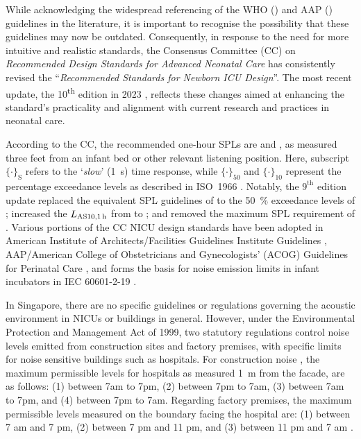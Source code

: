 While acknowledging the widespread referencing of the WHO (\citeyear{Berglund1999a}) and AAP (\citeyear{AAP1997}) guidelines in the literature, it is important to recognise the possibility that these guidelines may now be outdated. Consequently, in response to the need for more intuitive and realistic standards, the Consensus Committee (CC) on \textit{Recommended Design Standards for Advanced Neonatal Care} has consistently revised the ``\textit{Recommended Standards for Newborn ICU Design}''. The most recent update, the 10\textsuperscript{th} edition in 2023 \citep{altimier_recommended_2023}, reflects these changes aimed at enhancing the standard's practicality and alignment with current research and practices in neonatal care.

According to the CC, the recommended one-hour SPLs are  and , as measured three feet from an infant bed or other relevant listening position. Here, subscript $\{{\cdot}\}_\text{S}$ refers to the `\textit{slow}' (\SI{1}{\second}) time response, while $\{{\cdot}\}_{50}$ and $\{{\cdot}\}_{10}$ represent the percentage exceedance levels as described in ISO~1966 \cite{ISO1996-1}. Notably, the $9^\text{th}$ edition update replaced the equivalent SPL guidelines of  to the \SI{50}{\percent} exceedance levels of ; increased the $L_\text{AS10,\SI{1}{\hour}}$ from  to ; and removed the maximum SPL requirement of . Various portions of the CC NICU design standards have been adopted in American Institute of Architects/Facilities Guidelines Institute Guidelines \citep{FGI2022}, AAP/American College of Obstetricians and Gynecologists’ (ACOG) Guidelines for Perinatal Care \citep{AAPACOG2017}, and forms the basis for noise emission limits in infant incubators in IEC 60601-2-19 \citep{IEC60601-2-19}.

In Singapore, there are no specific guidelines or regulations governing the acoustic environment in NICUs or buildings in general. However, under the Environmental Protection and Management Act of 1999, two statutory regulations control noise levels emitted from construction sites and factory premises, with specific limits for noise sensitive buildings such as hospitals. For construction noise \citep{AGCConst2008}, the maximum permissible levels for hospitals as measured \SI{1}{\meter} from the facade, are as follows: (1)  between 7am to 7pm, (2)  between 7pm to 7am, (3)  between 7am to 7pm, and (4)  between 7pm to 7am. Regarding factory premises, the maximum permissible levels measured on the boundary facing the hospital are: (1)  between 7 am and 7 pm, (2)  between 7 pm and 11 pm, and (3)  between 11 pm and 7 am \citep{AGCFactoryNoise2008}. 


